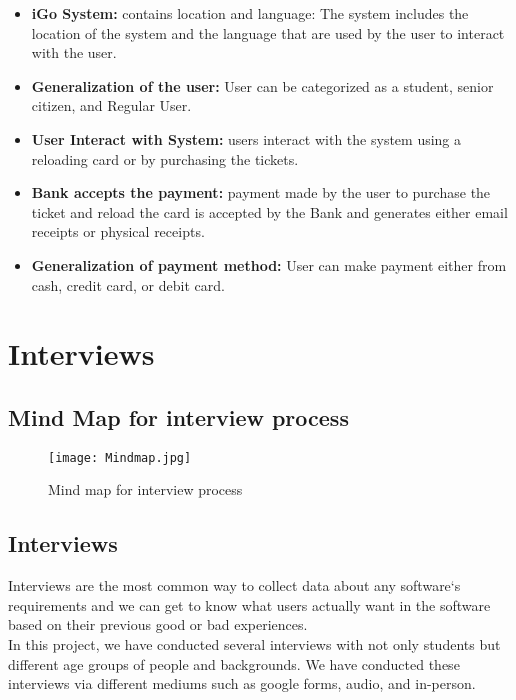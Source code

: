 \documentclass[a4paper,12pt]{report}
\begin{document}
\begin{itemize}
\item \textbf{iGo System:} contains location and language: The system includes the location of the system and the language that are used by the user to interact with the user.
\item \textbf{Generalization of the user:} User can be categorized as a student, senior citizen, and Regular User.
\item \textbf{User Interact with System:} users interact with the system using a reloading card or by purchasing the tickets.
\item \textbf{Bank accepts the payment:} payment made by the user to purchase the ticket and reload the card is accepted by the Bank and generates either email receipts or physical receipts.
\item \textbf{Generalization of payment method:} User can make payment either from cash, credit card, or debit card.
\end{itemize}

\chapter{Interviews}
\section{Mind Map for interview process}
\begin{figure}[h!]
  \centering
   \texttt{[image: Mindmap.jpg]}
  \caption{Mind map for interview process}
\end{figure}

\section{Interviews}
Interviews are the most common way to collect data about any software`s requirements and we can get to know what users actually want in the software based on their previous good or bad experiences.\\
In this project, we have conducted several interviews with not only students but different age groups of people and backgrounds. We have conducted these interviews via different mediums such as google forms, audio, and in-person.\\\\
\end{document}
